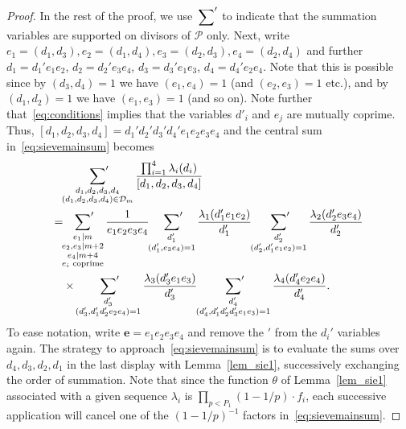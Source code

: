 \documentclass[12pt]{amsart}
\theoremstyle{definition}
\theoremstyle{remark}
\numberwithin{equation}{section}
\newcommand{\1}{\mathbf{1}}
\begin{document}
\begin{proof}
    In the rest of the proof, we use $\sideset{}{'}\sum$ to indicate that the summation variables are supported on divisors of $\mathcal{P}$ only. Next, write $e_1=(d_1,d_3), e_2=(d_1,d_4), e_3=(d_2,d_3), e_4=(d_2,d_4)$ and further $d_1=d_1'e_1e_2$, $d_2=d_2'e_3e_4$, $d_3=d_3'e_1e_3$, $d_4=d_4'e_2e_4$. Note that this is possible since by $(d_3,d_4)=1$ we have $(e_1,e_4)=1$ (and $(e_2,e_3)=1$ etc.), and by $(d_1,d_2)=1$ we have $(e_1,e_3)=1$ (and so on). Note further that~\eqref{eq:conditions} implies that the variables $d'_i$ and $e_j$ are mutually coprime. Thus, $[d_1,d_2,d_3,d_4]=d_1'd_2'd_3'd_4'e_1e_2e_3e_4$ and the central sum in~\eqref{eq:sievemainsum} becomes
	\begin{align*}
		&\sideset{}{'}\sum_{\substack{d_1, d_2, d_3, d_4\\ (d_1,d_2,d_3,d_4)\in \mathcal{D}_m}}\frac{\prod_{i=1}^4\lambda_{i}(d_i)}{[d_1,d_2,d_3,d_4]}\\
		=&\sideset{}{'}\sum_{\substack{e_1\mid m\\ e_2, e_3\mid  m+2 \\ e_4\mid m+4\\ e_i \text{ coprime}}}\frac{1}{e_1 e_2 e_3 e_4} \sideset{}{'}\sum_{\substack{d_1'\\ (d_1',e_3e_4)=1}} \frac{\lambda_1(d_1'e_1e_2)}{d_1'} \sideset{}{'}\sum_{\substack{d_2' \\ (d_2',d_1'e_1e_2)=1}} \frac{\lambda_2(d_2'e_3e_4)}{d_2'} \\
		&\times\sideset{}{'}\sum_{\substack{d_3' \\ (d_3',d_1'd_2'e_2 e_4)=1}} \frac{\lambda_3(d_3'e_1e_3)}{d_3'} \sideset{}{'}\sum_{\substack{d_4' \\ (d_4',d_1' d_2' d_3' e_1 e_3)=1}} \frac{\lambda_4(d_4'e_2e_4)}{d_4'}.
	\end{align*}
	To ease notation, write $\mathbf{e}=e_1e_2e_3e_4$ and remove the $'$ from the $d_i'$ variables again. The strategy to approach~\eqref{eq:sievemainsum} is to evaluate the sums over $d_4,d_3,d_2,d_1$ in the last display with Lemma~\ref{lem_sie1}, successively exchanging the order of summation. Note that since the function $\theta$ of Lemma~\ref{lem_sie1} associated with a given sequence $\lambda_i$ is $\prod_{p<P_1}(1-1/p) \cdot f_i$, each successive application will cancel one of the $(1-1/p)^{-1}$ factors in~\eqref{eq:sievemainsum}. 


\end{proof}
\end{document}
